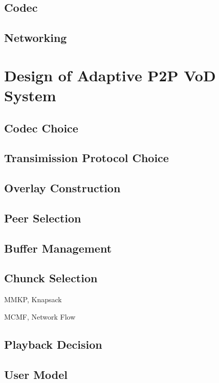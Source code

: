\documentclass[11pt,a4paper]{article}
\begin{document}
\subsection{Codec}

\subsection{Networking}

\section{Design of Adaptive P2P VoD System}


\subsection{Codec Choice}

\subsection{Transimission Protocol Choice}


\subsection{Overlay Construction}

\subsection{Peer Selection}


\subsection{Buffer Management}


\subsection{Chunck Selection}

MMKP, Knapsack

MCMF, Network Flow 



\subsection{Playback Decision}


\subsection{User Model}
\end{document}
